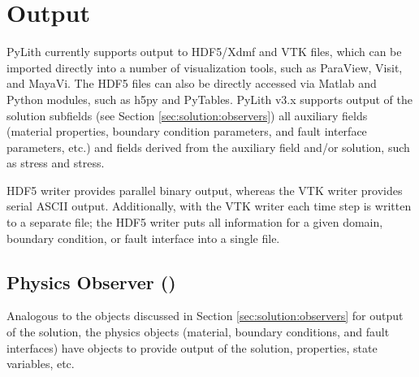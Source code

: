 \section{Output}

PyLith currently supports output to HDF5/Xdmf and VTK files, which can
be imported directly into a number of visualization tools, such as
ParaView, Visit, and MayaVi. The HDF5 files can also be directly
accessed via Matlab and Python modules, such as h5py and
PyTables. PyLith v3.x supports output of the solution subfields (see
Section \vref{sec:solution:observers}) all auxiliary fields
(material properties, boundary condition parameters, and fault interface
parameters, etc.) and fields derived from the auxiliary field and/or
solution, such as stress and stress.

HDF5 writer provides parallel binary output, whereas the VTK writer
provides serial ASCII output. Additionally, with the VTK writer each
time step is written to a separate file; the HDF5 writer puts all
information for a given domain, boundary condition, or fault interface
into a single file.


\subsection{Physics Observer ()}

Analogous to the  objects discussed in Section
\vref{sec:solution:observers} for output of the solution, the physics
objects (material, boundary conditions, and fault interfaces) have
 objects to provide output of the solution,
properties, state variables, etc. 

